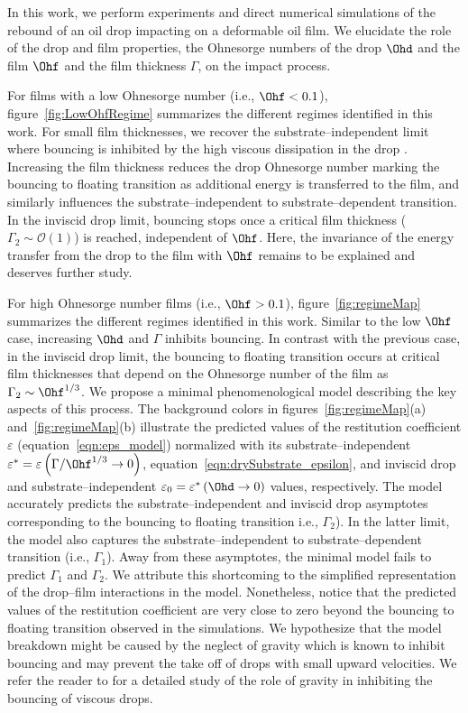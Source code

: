 In this work, we perform experiments and direct numerical simulations of the rebound of an oil drop impacting on a deformable oil film. We elucidate the role of the drop and film properties, the Ohnesorge numbers of the drop $\Ohd$ and the film $\Ohf$ and the film thickness $\Gamma$, on the impact process.

For films with a low Ohnesorge number (i.e., $\Ohf < 0.1$), figure~\ref{fig:LowOhfRegime} summarizes the different regimes identified in this work. For small film thicknesses, we recover the substrate--independent limit  where bouncing is inhibited by the high viscous dissipation in the drop \citep[$Oh_{d,c} \sim \mathcal{O}\left(1\right)$,][]{jha2020viscous}. Increasing the film thickness reduces the drop Ohnesorge number marking the bouncing to floating transition as additional energy is transferred to the film, and similarly influences the substrate--independent to substrate--dependent transition. In the inviscid drop limit, bouncing stops once a critical film thickness ($\Gamma_2 \sim \mathcal{O}\left(1\right)$) is reached, independent of $\Ohf$. Here, the invariance of the energy transfer from the drop to the film with $\Ohf$ remains to be explained and deserves further study.

For high Ohnesorge number films (i.e., $\Ohf > 0.1$), figure~\ref{fig:regimeMap} summarizes the different regimes identified in this work. Similar to the low $\Ohf$ case, increasing $\Ohd$ and $\Gamma$ inhibits bouncing. In contrast with the previous case, in the inviscid drop limit, the bouncing to floating transition occurs at critical film thicknesses that depend on the Ohnesorge number of the film as $\Gamma_2 \sim \Ohf^{1/3}$. We propose a minimal phenomenological model describing the key aspects of this process. The background colors in figures~\ref{fig:regimeMap}(a) and~\ref{fig:regimeMap}(b) illustrate the predicted values of the restitution coefficient $\varepsilon$ (equation~\eqref{eqn:eps_model}) normalized with its substrate--independent $\varepsilon^* = \varepsilon\left(\Gamma/\Ohf^{1/3} \to 0\right)$, equation~\eqref{eqn:drySubstrate_epsilon}, and inviscid drop and substrate--independent $\varepsilon_0 = \varepsilon^*\left(\Ohd \to 0\right)$ values, respectively. The model accurately predicts the substrate--independent and inviscid drop asymptotes corresponding to the bouncing to floating transition i.e., $\Gamma_2$).
In the latter limit, the model also captures the substrate--independent to substrate--dependent transition (i.e., $\Gamma_1$). Away from these asymptotes, the minimal model fails to predict $\Gamma_1$ and $\Gamma_2$. We attribute this shortcoming to the simplified representation of the drop--film interactions in the model. Nonetheless, notice that the predicted values of the restitution coefficient are very close to zero beyond the bouncing to floating transition observed in the simulations. We hypothesize that the model breakdown might be caused by the neglect of gravity which is known to inhibit bouncing \citep{biance2006} and may prevent the take off of drops with small upward velocities. We refer the reader to \citet{vatsalInProgressViscous} for a detailed study of the role of gravity in inhibiting the bouncing of viscous drops.

